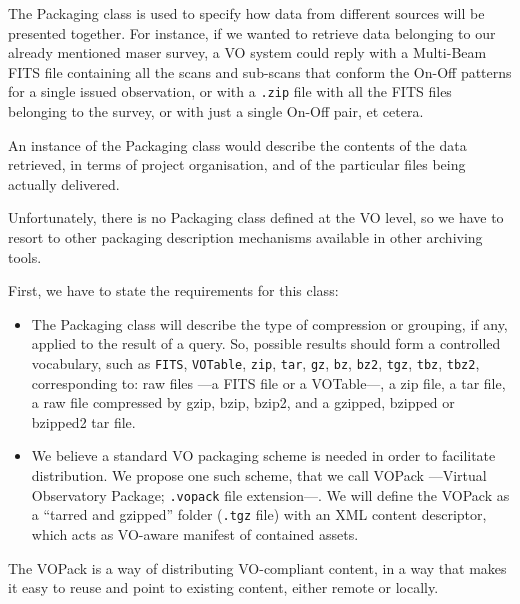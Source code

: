 			
			The Packaging class is used to specify how data from
			different sources will be presented together. For
			instance, if we wanted to retrieve data belonging to
			our already mentioned maser survey, a VO system could
			reply with a Multi-Beam FITS file containing all the
			scans and sub-scans that conform the On-Off patterns for
			a single issued observation, or with a \texttt{.zip}
			file with all the FITS files belonging to the survey,
			or with just a single On-Off pair, et cetera.
			
			 An instance of the Packaging class would describe the
			contents of the data retrieved, in terms of project
			organisation, and of the particular files being
			actually delivered.
			
			 Unfortunately, there is no Packaging class defined at
			the VO level, so we have to resort to other packaging
			description mechanisms available in other archiving
			tools.
			
			First, we have to state the requirements for this class:
			
			\begin{itemize}
				\item The Packaging class will describe the type of
				compression or grouping, if any, applied to the
				result of a query. So, possible results should form
				a controlled vocabulary, such as \texttt{FITS},
				\texttt{VOTable}, \texttt{zip}, \texttt{tar},
				\texttt{gz}, \texttt{bz}, \texttt{bz2},
				\texttt{tgz}, \texttt{tbz}, \texttt{tbz2},
				corresponding to: raw files ---a FITS file or a
				VOTable---, a zip file, a tar file, a raw file
				compressed by gzip, bzip, bzip2, and a gzipped,
				bzipped or bzipped2 tar file.
				
				 \item We believe a standard VO packaging scheme is
				needed in order to facilitate distribution. We
				propose one such scheme, that we call VOPack
				---Virtual Observatory Package; \texttt{.vopack}
				file extension---. We will define the VOPack as a
				“tarred and gzipped” folder (\texttt{.tgz} file)
				with an XML content descriptor, which acts as
				VO-aware manifest of contained assets.
			\end{itemize}
			
			The VOPack is a way of distributing VO-compliant
			content, in a way that makes it easy to reuse and point
			to existing content, either remote or locally.
			
